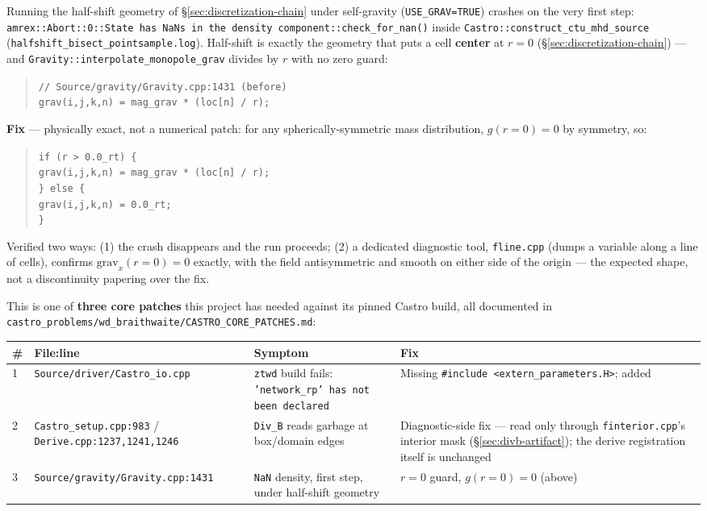 \documentclass[11pt,a4paper]{scrartcl}
\newcommand{\code}[1]{\texttt{\small #1}}
\begin{document}
Running the half-shift geometry of \S\ref{sec:discretization-chain}
under self-gravity (\code{USE\_GRAV=TRUE}) crashes on the very first
step: \code{amrex::Abort::0::State has NaNs in the density
component::check\_for\_nan()} inside
\code{Castro::construct\_ctu\_mhd\_source}
(\code{halfshift\_bisect\_pointsample.log}). Half-shift is exactly the
geometry that puts a cell \textbf{center} at $r=0$
(\S\ref{sec:discretization-chain}) --- and
\code{Gravity::interpolate\_monopole\_grav} divides by $r$ with no zero
guard:
\begin{quote}
\code{// Source/gravity/Gravity.cpp:1431 (before)}\\
\code{grav(i,j,k,n) = mag\_grav * (loc[n] / r);}
\end{quote}

\textbf{Fix} --- physically exact, not a numerical patch: for any
spherically-symmetric mass distribution, $g(r{=}0)=0$ by symmetry, so:
\begin{quote}
\code{if (r > 0.0\_rt) \{}\\
\code{\quad grav(i,j,k,n) = mag\_grav * (loc[n] / r);}\\
\code{\} else \{}\\
\code{\quad grav(i,j,k,n) = 0.0\_rt;}\\
\code{\}}
\end{quote}

Verified two ways: (1) the crash disappears and the run proceeds; (2) a
dedicated diagnostic tool, \code{fline.cpp} (dumps a variable along a
line of cells), confirms $\text{grav}_x(r{=}0)=0$ exactly, with the
field antisymmetric and smooth on either side of the origin --- the
expected shape, not a discontinuity papering over the fix.

This is one of \textbf{three core patches} this project has needed
against its pinned Castro build, all documented in
\code{castro\_problems/wd\_braithwaite/CASTRO\_CORE\_PATCHES.md}:

\begin{center}
\begin{tabular}{@{}p{0.5cm}p{4.4cm}p{4.6cm}p{4.4cm}@{}}
\toprule
\# & File:line & Symptom & Fix\\
\midrule
1 & \code{Source/driver/Castro\_io.cpp} & \code{ztwd} build fails: \code{'network\_rp' has not been declared} & Missing \code{\#include <extern\_parameters.H>}; added\\
2 & \code{Castro\_setup.cpp:983} / \code{Derive.cpp:1237,1241,1246} & \code{Div\_B} reads garbage at box/domain edges & Diagnostic-side fix --- read only through \code{finterior.cpp}'s interior mask (\S\ref{sec:divb-artifact}); the derive registration itself is unchanged\\
3 & \code{Source/gravity/Gravity.cpp:1431} & \code{NaN} density, first step, under half-shift geometry & $r{=}0$ guard, $g(r{=}0)=0$ (above)\\
\bottomrule
\end{tabular}
\end{center}
\end{document}
